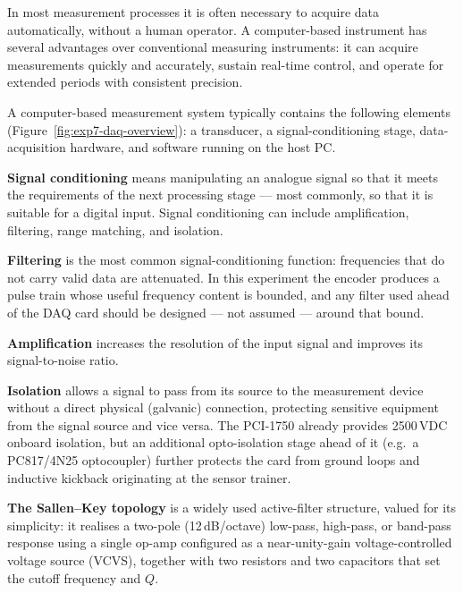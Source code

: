 \begin{introduction}
  In most measurement processes it is often necessary to acquire data automatically, without a human operator. A computer-based instrument has several advantages over conventional measuring instruments: it can acquire measurements quickly and accurately, sustain real-time control, and operate for extended periods with consistent precision.\vspace*{10pt}

  A computer-based measurement system typically contains the following elements (Figure~\ref{fig:exp7-daq-overview}): a transducer, a signal-conditioning stage, data-acquisition hardware, and software running on the host PC.\newpage

  \textbf{Signal conditioning} means manipulating an analogue signal so that it meets the requirements of the next processing stage --- most commonly, so that it is suitable for a digital input. Signal conditioning can include amplification, filtering, range matching, and isolation.\vspace*{10pt}

  \textbf{Filtering} is the most common signal-conditioning function: frequencies that do not carry valid data are attenuated. In this experiment the encoder produces a pulse train whose useful frequency content is bounded, and any filter used ahead of the DAQ card should be designed --- not assumed --- around that bound.\vspace*{10pt}

  \textbf{Amplification} increases the resolution of the input signal and improves its signal-to-noise ratio.\vspace*{10pt}

  \textbf{Isolation} allows a signal to pass from its source to the measurement device without a direct physical (galvanic) connection, protecting sensitive equipment from the signal source and vice versa. The PCI-1750 already provides 2500\,VDC onboard isolation, but an additional opto-isolation stage ahead of it (e.g.\ a PC817/4N25 optocoupler) further protects the card from ground loops and inductive kickback originating at the sensor trainer.\vspace*{10pt}

  \textbf{The Sallen--Key topology} is a widely used active-filter structure, valued for its simplicity: it realises a two-pole (12\,dB/octave) low-pass, high-pass, or band-pass response using a single op-amp configured as a near-unity-gain voltage-controlled voltage source (VCVS), together with two resistors and two capacitors that set the cutoff frequency and $Q$.
\end{introduction}
\vspace*{1.5em}

